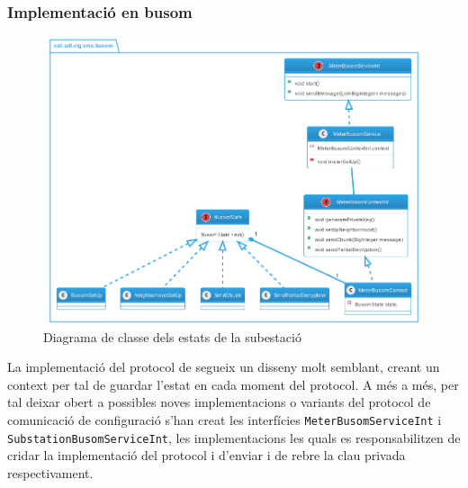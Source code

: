 \subsubsection{Implementació en busom}
\begin{figure}[H]
	\centering
	\includegraphics[width=14cm]{classes/busomprot.png}
	\caption{Diagrama de classe dels estats de la subestació}
	\label{fig:diss-busom}
\end{figure}
La implementació del protocol de \cite{busom} segueix un disseny molt semblant, creant un context per tal de guardar l'estat en cada moment del protocol. A més a més, per tal deixar obert a possibles noves implementacions o variants del protocol de comunicació de configuració s'han creat les interfícies \texttt{MeterBusomServiceInt} i \texttt{SubstationBusomServiceInt}, les implementacions les quals es responsabilitzen de cridar la implementació del protocol i d'enviar i de rebre la clau privada respectivament.

